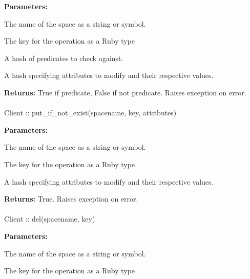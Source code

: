 \noindent\textbf{Parameters:}
\begin{description}[labelindent=\widthof{{\code{predicates}}},leftmargin=*,noitemsep,nolistsep,align=right]
\item[\code{spacename}] The name of the space as a string or symbol.
\item[\code{key}] The key for the operation as a Ruby type
\item[\code{predicates}] A hash of predicates to check against.
\item[\code{attributes}] A hash specifying attributes to modify and their respective values.
\end{description}

\noindent\textbf{Returns:}
True if predicate, False if not predicate.  Raises exception on error.

\paragraph{}
\label{api:ruby:put_if_not_exist}
\begin{ccode}
Client :: put_if_not_exist(spacename, key, attributes)
\end{ccode}
\funcdesc 

\noindent\textbf{Parameters:}
\begin{description}[labelindent=\widthof{{\code{attributes}}},leftmargin=*,noitemsep,nolistsep,align=right]
\item[\code{spacename}] The name of the space as a string or symbol.
\item[\code{key}] The key for the operation as a Ruby type
\item[\code{attributes}] A hash specifying attributes to modify and their respective values.
\end{description}

\noindent\textbf{Returns:}
True.  Raises exception on error.

\paragraph{}
\label{api:ruby:del}
\begin{ccode}
Client :: del(spacename, key)
\end{ccode}
\funcdesc 

\noindent\textbf{Parameters:}
\begin{description}[labelindent=\widthof{{\code{spacename}}},leftmargin=*,noitemsep,nolistsep,align=right]
\item[\code{spacename}] The name of the space as a string or symbol.
\item[\code{key}] The key for the operation as a Ruby type
\end{description}

